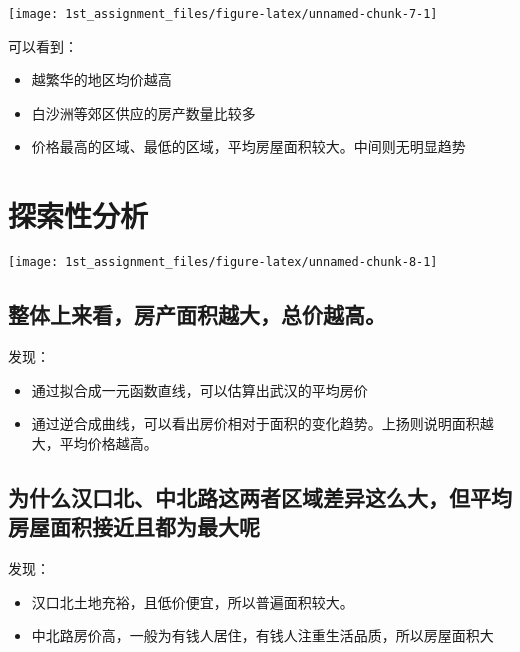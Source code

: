 \documentclass[
]{article}
\begin{document}
\begin{center}\texttt{[image: 1st\_assignment\_files/figure-latex/unnamed-chunk-7-1]} \end{center}

可以看到：

\begin{itemize}
\item
  越繁华的地区均价越高
\item
  白沙洲等郊区供应的房产数量比较多
\item
  价格最高的区域、最低的区域，平均房屋面积较大。中间则无明显趋势
\end{itemize}

\section{探索性分析}\label{ux63a2ux7d22ux6027ux5206ux6790}

\begin{center}\texttt{[image: 1st\_assignment\_files/figure-latex/unnamed-chunk-8-1]} \end{center}

\subsection{整体上来看，房产面积越大，总价越高。}\label{ux6574ux4f53ux4e0aux6765ux770bux623fux4ea7ux9762ux79efux8d8aux5927ux603bux4ef7ux8d8aux9ad8}

发现：

\begin{itemize}
\item
  通过拟合成一元函数直线，可以估算出武汉的平均房价
\item
  通过逆合成曲线，可以看出房价相对于面积的变化趋势。上扬则说明面积越大，平均价格越高。
\end{itemize}

\subsection{为什么汉口北、中北路这两者区域差异这么大，但平均房屋面积接近且都为最大呢}\label{ux4e3aux4ec0ux4e48ux6c49ux53e3ux5317ux4e2dux5317ux8defux8fd9ux4e24ux8005ux533aux57dfux5deeux5f02ux8fd9ux4e48ux5927ux4f46ux5e73ux5747ux623fux5c4bux9762ux79efux63a5ux8fd1ux4e14ux90fdux4e3aux6700ux5927ux5462}

发现：

\begin{itemize}
\item
  汉口北土地充裕，且低价便宜，所以普遍面积较大。
\item
  中北路房价高，一般为有钱人居住，有钱人注重生活品质，所以房屋面积大
\end{itemize}
\end{document}
